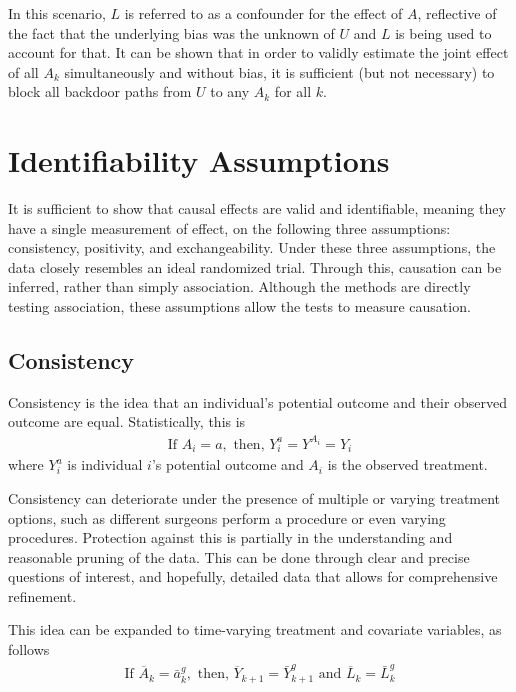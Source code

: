 In this scenario, $L$ is referred to as a confounder for the effect of $A$, reflective of the fact that the underlying bias was the unknown of $U$ and $L$ is being used to account for that.  It can be shown that in order to validly estimate the joint effect of all $A_k$ simultaneously and without bias, it is sufficient (but not necessary) to block all backdoor paths from $U$ to any $A_k$ for all $k$.\cite{pearl1995probabilistic}

\section{Identifiability Assumptions} \label{assumptions} 
It is sufficient to show that causal effects are valid and identifiable, meaning they have a single measurement of effect, on the following three assumptions: consistency, positivity, and exchangeability.\cite{cole2009consistency, hernan_robins_2016}   Under these three assumptions, the data closely resembles an ideal randomized trial.  Through this, causation can be inferred, rather than simply association.  Although the methods are directly testing association, these assumptions allow the tests to measure causation.  
 
\subsection{Consistency} 
Consistency is the idea that an individual's potential outcome and their observed outcome are equal\cite{cole2009consistency, hernan_robins_2016}.  Statistically, this is 
\begin{align} 
\text{If  } A_i = a, \text{     then,    } Y_i^a = Y^{A_i} = Y_i 
\end{align} 
where $Y_i^a$ is individual $i$'s potential outcome and $A_i$ is the observed treatment.  

Consistency can deteriorate under the presence of multiple or varying treatment options, such as different surgeons perform a procedure or even varying procedures.  Protection against this is partially in the understanding and reasonable pruning of the data.  This can be done through clear and precise questions of interest, and hopefully, detailed data that allows for comprehensive refinement.  

This idea can be expanded to time-varying treatment and covariate variables, as follows 
\begin{align} 
\text{If } \overline{A}_k = \bar{a}^g _k, \text{ then, } \overline{Y}_{k+1} =  \bar{Y}^g_{k+1} \text{ and } \overline{L}_k = \bar{L}^g_k
\end{align}

